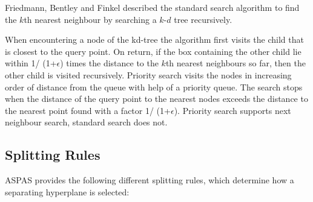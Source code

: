 Friedmann, Bentley and Finkel \cite{fbf-afbml-77} described the standard
search algorithm to find the $k$th nearest neighbour by searching a $k$-$d$ tree recursively.

When encountering a node of the kd-tree the algorithm first visits the child that is closest
to the query point. On return, if the box containing  the other child lie within
1/ (1+$\epsilon$) times the distance to the $k$th nearest neighbours so far, then
the other child is visited recursively.
Priority search \cite{am-annqf-93} visits the nodes in increasing order of distance from
the queue with help of a priority queue.
The search stops when the distance of the query point to the nearest nodes
exceeds the distance to the nearest point found with a factor 1/ (1+$\epsilon$).
Priority search supports next neighbour search, standard search does not.

\subsection {Splitting Rules}

ASPAS provides the following different splitting rules,
which determine how a separating hyperplane is selected:

